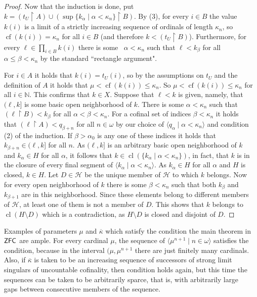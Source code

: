 \documentclass{amsart}
\theoremstyle{remark}
\DeclareMathOperator{\zfc}{\sf ZFC}
\DeclareMathOperator{\cf}{cf}
\DeclareMathOperator{\cl}{cl}
\renewcommand\mid{\mathrel{|}\allowbreak}
\begin{document}
\begin{proof}
        Now that the induction is done, put
        \(k=(t_{U}\restriction A)\cup (\sup\{k_{\alpha}\mid \alpha<\kappa_{n}\}\restriction B)\).
By (3), for every \(i\in B\) the value \(k(i)\) is a limit of a strictly increasing
sequence of ordinals of length \(\kappa_{n}\), so \(\cf(k(i))=\kappa_{n}\) for all
\(i\in B\) (and therefore \(k<(t_{U}\restriction B)\)). Furthermore, for every \(\ell\in \prod_{{i\in B}}k(i)\) there is some \
\(\alpha<\kappa_n\) such that \(\ell<k_\beta\) for all
\(\alpha\le \beta<\kappa_n\) by the standard ``rectangle argument".

For \(i\in A\) it holds that \(k(i)=t_U(i)\), so by the assumptions on
\(t_{U}\) and the definition of \(A\) it holds that \(\mu<\cf(k(i))\le \kappa_{n}\).
So \(\mu<\cf(k(i))\le \kappa_{n}\) for all \(i\in \mathbb N\). This confirms that \(k\in X\).
 Suppose that \(\ell <k\) is given, namely, that \((\ell,k]\) is some basic open
 neighborhood of \(k\).
 There is some \(\alpha<\kappa_n\) such that \((\ell\restriction B)<k_{\beta}\) for all
   \(\alpha<\beta<\kappa_n\). For a cofinal set of indices \(\beta<\kappa_n\) it holds
   that
   \((\ell\restriction A)<q_{\beta+n}\) for all \(n\in \omega\)  by our choice of
   \(\langle q_{\alpha}\mid \alpha<\kappa_n\rangle\) and condition (2) of the induction. If \(\beta>\alpha_{0}\) is
   any one of these indices it holds that \(k_{\beta+n}\in (\ell,k]\) for all \(n\). As
   \((\ell,k]\) is an arbitrary basic open neighborhood of \(k\) and \(k_{\alpha}\in H\)
   for all \(\alpha\), it follows that \(k\in \cl (\{k_{\alpha}\mid\alpha<\kappa_n\})\), in fact, that \(k\) is
       in the closure of every final segment of \(\langle k_{\alpha}\mid\alpha<\kappa_n\rangle\). As
       \(k_{\alpha}\in H\) for all \(\alpha\) and \(H\) is closed,  \(k\in H\). Let
        \(D\in \mathcal H\) be the unique member of \(\mathcal H\) to which \(k\)
        belongs. Now for every open neighborhood of \(k\) there is some
        \(\beta<\kappa_n\) such that both \(k_{\beta}\) and \(k_{\beta+1}\) are in this
        neighborhood. Since these elements belong to different members of
        \(\mathcal H\), at least one of them is not a member of \(D\). This
        shows that \(k\) belongs to \(\cl(H\setminus D)\) which is a contradiction, as
        \(H\setminus D\) is closed and disjoint of \(D\).
      \end{proof}


Examples of parameters \(\mu\) and \(\overline \kappa\) which satisfy the condition 
the main theorem in \(\zfc\) are ample. For every cardinal \(\mu\), the sequence of 
\(\langle \mu^{n+1}\mid n\in \omega\rangle\)  satisfies the condition, because in 
the interval \((\mu,\mu^{n+1}\) there are just finitely many cardinals. 
Also, if \(\overline \kappa\) is taken to be an increasing sequence of 
successors of strong limit singulars of uncountable cofinality, then 
condition holds again, but this time the sequences can be taken to be arbitrarily sparce, that is, with arbitrarily large gaps between consecutive members of the sequence. 
\end{document}
